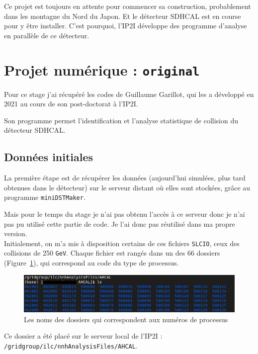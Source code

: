 \documentclass[10pt,a4paper]{report}
\newcommand{\SLCIO}{\texttt{SLCIO}\xspace}
\newcommand{\original}{\texttt{original}\xspace}
\newcommand{\minidstmarker}{\texttt{miniDSTMaker}\xspace}
\newcommand{\GeV}{\texttt{GeV}}
\begin{document}
Ce projet est toujours en attente pour commencer sa construction, probablement dans les montagne du Nord du Japon. Et le détecteur SDHCAL est en course pour y être installer. C'est pourquoi, l'IP2I développe des programme d'analyse en parallèle de ce détecteur.

\section{Projet numérique : \original}

Pour ce stage j'ai récupéré les codes de Guillaume Garillot, qui les a développé en 2021 au cours de son post-doctorat à l'IP2I. 

Son programme permet l'identification et l'analyse statistique de collision du détecteur SDHCAL.

\subsection{Données initiales}

La première étape est de récupérer les données (aujourd'hui simulées, plus tard obtenues dans le détecteur) sur le serveur distant où elles sont stockées, grâce au programme \minidstmarker. 

Mais pour le temps du stage je n'ai pas obtenu l'accès à ce serveur donc je n'ai pas pu utilisé cette partie de code. Je l'ai donc pas réutilisé dans ma propre version.\\

Initialement, on m'a mis à disposition certains de ces fichiers \SLCIO, ceux des collisions de 250 \GeV. 
Chaque fichier est rangés dans un des 66 dossiers (Figure~\ref{data:list}), qui correspond au code du type de processus.

\begin{figure}[h!]
	\includegraphics[width=\textwidth]{../img/listeProcessus.png} 
	\caption{Les noms des dossiers qui correspondent aux numéros de processus}
	\label{data:list}
\end{figure}

Ce dossier a été placé sur le serveur local de l'IP2I : \texttt{/gridgroup/ilc/nnhAnalysisFiles/AHCAL}.
\end{document}
